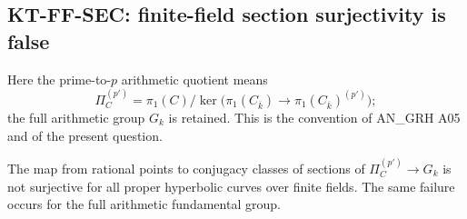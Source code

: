 \subsection{KT-FF-SEC: finite-field section surjectivity is false}
\label{sec:kt-ff-sec}

Here the prime-to-$p$ arithmetic quotient means
\[
 \Pi_C^{(p')}=\pi_1(C)/
 \ker\bigl(\pi_1(C_{\overline k})\longrightarrow
                   \pi_1(C_{\overline k})^{(p')}\bigr);
\]
the full arithmetic group $G_k$ is retained. This is the convention
of AN\_GRH A05 and of the present question.

\begin{proposition}[KT-FF-SEC]
The map from rational points to conjugacy classes of sections of
$\Pi_C^{(p')}\to G_k$ is not surjective for all proper hyperbolic
curves over finite fields. The same failure occurs for the full
arithmetic fundamental group.
\end{proposition}

